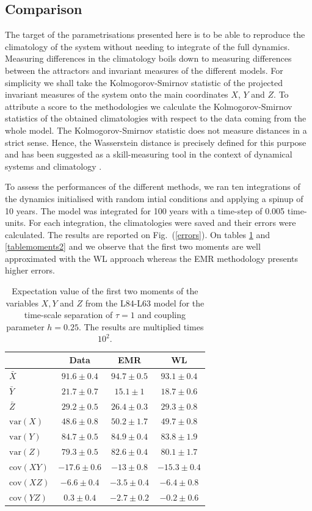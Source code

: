 \documentclass[12pt]{article}
\begin{document}
\subsection{Comparison}

The target of the parametrisations presented here is to be able to reproduce the climatology of the system without needing to integrate of the full dynamics. Measuring differences in the climatology boils down to measuring differences between the attractors and invariant measures of the different models. For simplicity we shall take the Kolmogorov-Smirnov statistic of the projected invariant measures of the system onto the main coordinates $X$, $Y$ and $Z$. To attribute a score to the methodologies we calculate the Kolmogorov-Smirnov statistics of the obtained climatologies with respect to the data coming from the whole model. The Kolmogorov-Smirnov statistic does not measure distances in a strict sense. Hence, the Wasserstein distance \cite{villani} is precisely defined for this purpose and has been suggested as a skill-measuring tool in the context of dynamical systems and climatology \cite{robin2017, Vissio2018b}. 

To assess the performances of the different methods, we ran ten integrations of the dynamics initialised with random intial conditions and applying a spinup of 10 years. The model was integrated for 100 years with a time-step of 0.005 time-units.  For each integration, the climatologies were saved and their errors were calculated. The results are reported on Fig.~(\ref{errors}). On tables \ref{tablemoments1} and \ref{tablemoments2} and we observe that the first two moments are well approximated with the WL approach whereas the EMR methodology presents higher errors.
\begin{table}[H]
	\centering
	\begin{tabular}{l | ccc}
		& Data & EMR  & WL \\ 
		\hline 
		$\bar{X}$&$91.6 \pm 0.4$ &$ 94.7 \pm 0.5 $&$ 93.1 \pm 0.4 $\\ 
		$\bar{Y}$&$21.7 \pm 0.7 $&$ 15.1 \pm 1 $&$ 18.7 \pm 0.6 $\\ 
		$\bar{Z}$&$29.2 \pm 0.5 $& $26.4 \pm 0.3 $& $29.3 \pm 0.8 $\\ 
		$\mathrm{var}(X)$&$48.6 \pm 0.8 $& $50.2 \pm 1.7 $& $49.7 \pm 0.8$ \\ 
		$\mathrm{var}(Y)$&$84.7 \pm 0.5 $&$ 84.9 \pm 0.4$ &$ 83.8 \pm 1.9 $\\ 
		$\mathrm{var}(Z)$&$79.3 \pm 0.5 $& $82.6 \pm 0.4 $&$ 80.1 \pm 1.7$ \\ 
		$\mathrm{cov}(XY)$&$-17.6 \pm 0.6 $& $-13 \pm 0.8 $& $-15.3 \pm 0.4$ \\ 
		$\mathrm{cov}(XZ)$&$-6.6 \pm 0.4 $&$ -3.5 \pm 0.4 $& $-6.4 \pm 0.8$ \\ 
		$\mathrm{cov}(YZ)$&$0.3 \pm 0.4 $& $-2.7 \pm 0.2$ & $-0.2 \pm 0.6$ \\ 
	\end{tabular}
	\caption{\label{tablemoments1}Expectation value of the first two moments of the variables $X,Y$ and $Z$ from the L84-L63 model for the time-scale separation of $\tau = 1$ and coupling parameter $h=0.25$. The results are multiplied times $10^2$.}
\end{table}
\end{document}
